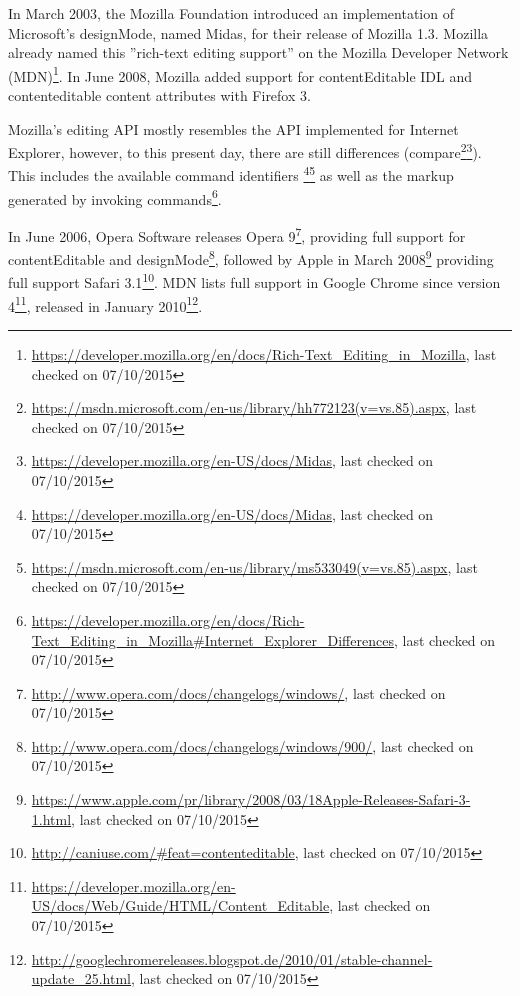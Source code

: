In March 2003, the Mozilla Foundation introduced an implementation of Microsoft's designMode, named Midas, for their release of Mozilla 1.3. Mozilla already named this ''rich-text editing support'' on the Mozilla Developer Network (MDN)\footnote{\url{https://developer.mozilla.org/en/docs/Rich-Text\_Editing\_in\_Mozilla}, last checked on 07/10/2015}. In June 2008, Mozilla added support for contentEditable IDL and contenteditable content attributes with Firefox 3. 

Mozilla's editing API mostly resembles the API implemented for Internet Explorer, however, to this present day, there are still differences (compare\footnote{\url{https://msdn.microsoft.com/en-us/library/hh772123(v=vs.85).aspx}, last checked on 07/10/2015}\footnote{\url{https://developer.mozilla.org/en-US/docs/Midas}, last checked on 07/10/2015}). This includes the available command identifiers \footnote{\url{https://developer.mozilla.org/en-US/docs/Midas}, last checked on 07/10/2015}\footnote{\url{https://msdn.microsoft.com/en-us/library/ms533049(v=vs.85).aspx}, last checked on 07/10/2015} as well as the markup generated by invoking commands\footnote{\url{https://developer.mozilla.org/en/docs/Rich-Text\_Editing\_in\_Mozilla#Internet\_Explorer\_Differences}, last checked on 07/10/2015}. 



In June 2006, Opera Software releases Opera 9\footnote{\url{http://www.opera.com/docs/changelogs/windows/}, last checked on 07/10/2015}, providing full support for contentEditable and designMode\footnote{\url{http://www.opera.com/docs/changelogs/windows/900/}, last checked on 07/10/2015}, followed by Apple in March 2008\footnote{\url{https://www.apple.com/pr/library/2008/03/18Apple-Releases-Safari-3-1.html}, last checked on 07/10/2015} providing full support Safari 3.1\footnote{\url{http://caniuse.com/#feat=contenteditable}, last checked on 07/10/2015}. MDN lists full support in Google Chrome since version 4\footnote{\url{https://developer.mozilla.org/en-US/docs/Web/Guide/HTML/Content\_Editable}, last checked on 07/10/2015}, released in January 2010\footnote{\url{http://googlechromereleases.blogspot.de/2010/01/stable-channel-update\_25.html}, last checked on 07/10/2015}.


